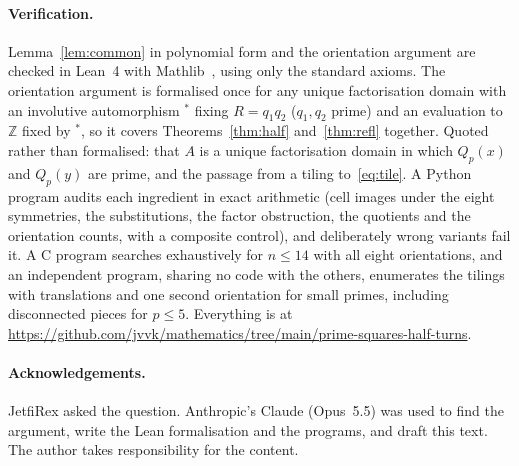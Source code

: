 \documentclass[11pt]{article}
\theoremstyle{remark}
\newcommand{\Z}{\mathbb{Z}}
\begin{document}
\paragraph{Verification.} Lemma~\ref{lem:common} in polynomial form and the orientation argument are checked in
Lean~4 with Mathlib~\cite{mathlib}, using only the standard axioms. The orientation argument is formalised once
for any unique factorisation domain with an involutive automorphism ${}^*$ fixing $R=q_1q_2$ ($q_1,q_2$ prime)
and an evaluation to $\Z$ fixed by ${}^*$, so it covers Theorems~\ref{thm:half} and~\ref{thm:refl} together.
Quoted rather than formalised: that $A$ is a unique factorisation domain in which $Q_p(x)$ and $Q_p(y)$ are
prime, and the passage from a tiling to~\eqref{eq:tile}. A Python program audits each ingredient in exact
arithmetic (cell images under the eight symmetries, the substitutions, the factor obstruction, the quotients
and the orientation counts, with a composite control), and deliberately wrong variants fail it. A C program
searches exhaustively for $n\le14$ with all eight orientations, and an independent program, sharing no code
with the others, enumerates the tilings with translations and one second orientation for small primes,
including disconnected pieces for $p\le5$. Everything is at
\url{https://github.com/jvvk/mathematics/tree/main/prime-squares-half-turns}.

\paragraph{Acknowledgements.} JetfiRex asked the question. Anthropic's Claude (Opus~5.5) was used to find the
argument, write the Lean formalisation and the programs, and draft this text. The author takes
responsibility for the content.
\end{document}
